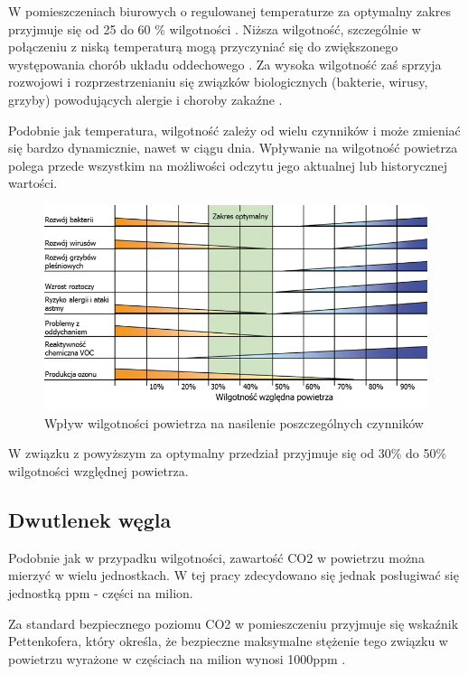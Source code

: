 \documentclass[a4paper, 12pt]{article}
\begin{document}
W pomieszczeniach biurowych o regulowanej temperaturze za optymalny zakres przyjmuje się 
od 25 do 60 \% wilgotności \cite{inz-bud}. Niższa wilgotność, szczególnie w połączeniu z niską temperaturą 
mogą przyczyniać się do zwiększonego występowania chorób układu oddechowego \cite{low-hum}. Za wysoka wilgotność 
zaś sprzyja rozwojowi i rozprzestrzenianiu się związków biologicznych (bakterie, wirusy, grzyby) 
powodujących alergie i choroby zakaźne \cite{high-hum}.

Podobnie jak temperatura, wilgotność zależy od wielu czynników i może zmieniać się bardzo dynamicznie, 
nawet w ciągu dnia. Wpływanie na wilgotność powietrza polega przede wszystkim na możliwości odczytu 
jego aktualnej lub historycznej wartości.

\begin{figure}[H]
    \includegraphics[width=\textwidth]{zdj/wilgotnosc_powietrza_w_pomieszczeniach.jpg}
    \caption{Wpływ wilgotności powietrza na nasilenie poszczególnych czynników}
\end{figure}

W związku z powyższym za optymalny przedział przyjmuje się od 30\% do 50\% wilgotności względnej 
powietrza.

\subsection{Dwutlenek węgla}

Podobnie jak w przypadku wilgotności, zawartość CO2 w powietrzu można mierzyć w wielu jednostkach. 
W tej pracy zdecydowano się jednak posługiwać się jednostką ppm - części na milion.

Za standard bezpiecznego poziomu CO2 w pomieszczeniu przyjmuje się wskaźnik Pettenkofera, który określa, 
że bezpieczne maksymalne stężenie tego związku w powietrzu wyrażone w częściach na milion wynosi 1000ppm \cite{pettenhofer}.
\end{document}
